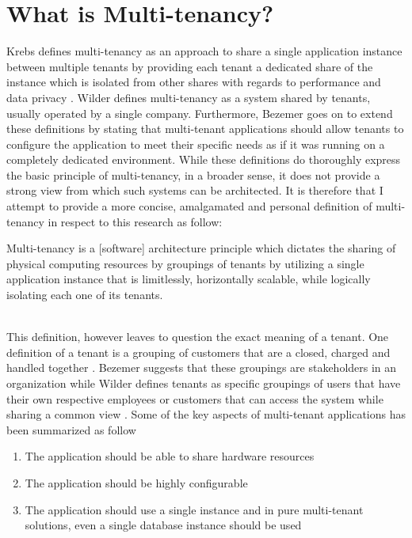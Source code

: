\section{What is Multi-tenancy?}

Krebs defines multi-tenancy as an approach to share a single application instance between multiple tenants by providing each tenant a dedicated share of the instance which is isolated from other shares with regards to performance and data privacy \cite{Krebs2012}.
Wilder \cite{Wilder2012-so} defines multi-tenancy as a system shared by tenants, usually operated by a single company. Furthermore, Bezemer goes on to extend these definitions by stating that multi-tenant applications should allow tenants to configure the application to meet their specific needs as if it was running on a completely dedicated environment\cite{Bezemer:2010:MSA:1862372.1862393}. While these definitions do thoroughly express the basic principle of multi-tenancy, in a broader sense, it does not provide a strong view from which such systems can be architected. It is therefore that I attempt to provide a more concise, amalgamated and personal definition of multi-tenancy in respect to this research as follow:
\\
\begin{fancyquotes}
Multi-tenancy is a [software] architecture principle which dictates the sharing of physical computing resources by groupings of tenants by utilizing a single application instance that is limitlessly, horizontally scalable, while logically isolating each one of its tenants.
\end{fancyquotes}
\\
This definition, however leaves to question the exact meaning of a tenant. One definition of a tenant is a grouping of customers that are a closed, charged and handled together \cite{Krebs2012}. Bezemer suggests that these groupings are stakeholders in an organization  \cite{Bezemer:2010:MSA:1862372.1862393} while Wilder defines tenants as specific groupings of users that have their own respective employees or customers that can access the system while sharing a common view \cite{Wilder2012-so}.
Some of the key aspects of multi-tenant applications has been summarized as follow \cite{Bezemer:2010:MSA:1862372.1862393}
\begin{enumerate}
\item The application should be able to share hardware resources
\item The application should be highly configurable
\item  The application should use a single instance and in pure multi-tenant solutions, even a single database instance should be used
\end{enumerate}


